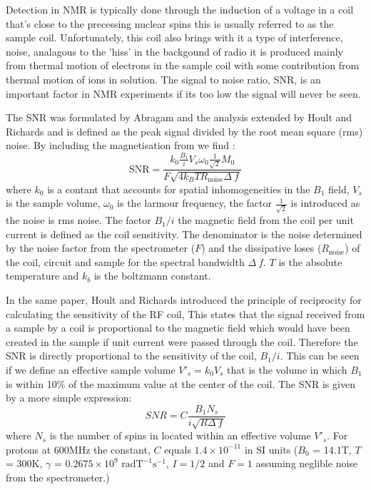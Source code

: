 Detection in NMR is typically done through the induction of a voltage in a coil that's close
to the precessing nuclear spins this is usually referred to as the sample coil. Unfortunately,
this coil also brings with it a type of interference, noise, analagous to the 'hiss' in the backgound
of radio it is produced mainly from thermal motion of electrons in the sample coil with some contribution from thermal
motion of ions in solution. The signal to noise ratio, SNR, is an important factor in NMR experiments if its too low
the signal will never be seen.

The SNR was formulated by Abragam\citep{Abragam:1961vg} and the analysis extended by Hoult and
Richards\citep{Hoult:1976dw} and is defined as the peak signal divided by the root mean square (rms) noise. By including
the magnetisation from  we find \citep{vanBentum:2007fda}:
\begin{equation}\label{eqn:SNR}
  \text{SNR} = \frac{k_0\frac{B_1}{i}V_s\omega_0\frac{1}{\sqrt{2}}M_0}{F\sqrt{4k_BTR_{\text{noise}}\Delta~f}}
\end{equation}
where $k_0$ is a contant that accounts for spatial inhomogeneities in the $B_1$ field, $V_s$ is the sample volume,
$\omega_0$ is the larmour frequency, the factor $\frac{1}{\sqrt{2}}$ is introduced as the noise is rms noise. The
factor $B_1/i$ the magnetic field from the coil per unit current is defined as the coil sensitivity. The denominator is
the noise determined by the noise factor from the spectrometer ($F$) and the dissipative loses ($R_{\text{noise}}$) of
the coil, circuit and sample for the spectral bandwidth $\Delta~f$. $T$ is the absolute temperature and $k_b$ is the
boltzmann constant.

In the same paper, Hoult and Richards introduced the principle of reciprocity for calculating the
sensitivity of the RF coil, This states that the signal received from a sample by a coil is proportional to the magnetic
field which would have been created in the sample if unit current were passed through the coil. Therefore the SNR is
directly proportional to the sensitivity of the coil, $B_1/i$. This can be seen if we define an
effective sample volume $V'_s = k_0V_s$ that is the volume in which $B_1$ is within 10\% of the maximum
value at the center of the coil. The SNR is given by a more simple expression\citep{vanBentum:2007fda}:
\begin{equation}
  SNR = C\frac{B_1N_s}{i\sqrt{R\Delta~f}}
\end{equation}
where $N_s$ is the number of spins in located within an effective volume $V'_s$.
For protons at 600MHz the constant, $C$ equals $1.4\times10^{-11}$ in SI units ($B_0$ = 14.1T, $T$ = 300K, $\gamma$ =
$0.2675\times10^9$ $\text{rad} \text{T}^{-1}\text{s}^{-1}$, $I = 1/2$ and $F = 1$ assuming neglible noise from the spectrometer.)


